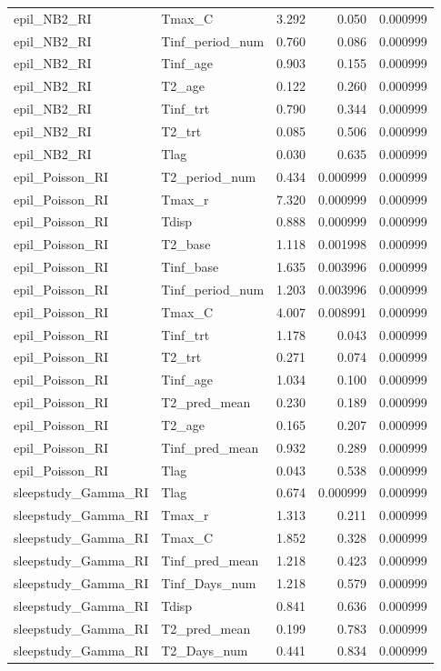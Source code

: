 \begin{landscape}
\begin{center}
\begin{longtable}{llrrr}
epil\_NB2\_RI & Tmax\_C & 3.292 & 0.050 & 0.000999 \\
epil\_NB2\_RI & Tinf\_period\_num & 0.760 & 0.086 & 0.000999 \\
epil\_NB2\_RI & Tinf\_age & 0.903 & 0.155 & 0.000999 \\
epil\_NB2\_RI & T2\_age & 0.122 & 0.260 & 0.000999 \\
epil\_NB2\_RI & Tinf\_trt & 0.790 & 0.344 & 0.000999 \\
epil\_NB2\_RI & T2\_trt & 0.085 & 0.506 & 0.000999 \\
epil\_NB2\_RI & Tlag & 0.030 & 0.635 & 0.000999 \\
epil\_Poisson\_RI & T2\_period\_num & 0.434 & 0.000999 & 0.000999 \\
epil\_Poisson\_RI & Tmax\_r & 7.320 & 0.000999 & 0.000999 \\
epil\_Poisson\_RI & Tdisp & 0.888 & 0.000999 & 0.000999 \\
epil\_Poisson\_RI & T2\_base & 1.118 & 0.001998 & 0.000999 \\
epil\_Poisson\_RI & Tinf\_base & 1.635 & 0.003996 & 0.000999 \\
epil\_Poisson\_RI & Tinf\_period\_num & 1.203 & 0.003996 & 0.000999 \\
epil\_Poisson\_RI & Tmax\_C & 4.007 & 0.008991 & 0.000999 \\
epil\_Poisson\_RI & Tinf\_trt & 1.178 & 0.043 & 0.000999 \\
epil\_Poisson\_RI & T2\_trt & 0.271 & 0.074 & 0.000999 \\
epil\_Poisson\_RI & Tinf\_age & 1.034 & 0.100 & 0.000999 \\
epil\_Poisson\_RI & T2\_pred\_mean & 0.230 & 0.189 & 0.000999 \\
epil\_Poisson\_RI & T2\_age & 0.165 & 0.207 & 0.000999 \\
epil\_Poisson\_RI & Tinf\_pred\_mean & 0.932 & 0.289 & 0.000999 \\
epil\_Poisson\_RI & Tlag & 0.043 & 0.538 & 0.000999 \\
sleepstudy\_Gamma\_RI & Tlag & 0.674 & 0.000999 & 0.000999 \\
sleepstudy\_Gamma\_RI & Tmax\_r & 1.313 & 0.211 & 0.000999 \\
sleepstudy\_Gamma\_RI & Tmax\_C & 1.852 & 0.328 & 0.000999 \\
sleepstudy\_Gamma\_RI & Tinf\_pred\_mean & 1.218 & 0.423 & 0.000999 \\
sleepstudy\_Gamma\_RI & Tinf\_Days\_num & 1.218 & 0.579 & 0.000999 \\
sleepstudy\_Gamma\_RI & Tdisp & 0.841 & 0.636 & 0.000999 \\
sleepstudy\_Gamma\_RI & T2\_pred\_mean & 0.199 & 0.783 & 0.000999 \\
sleepstudy\_Gamma\_RI & T2\_Days\_num & 0.441 & 0.834 & 0.000999 \\
\end{longtable}
\end{center}
\end{landscape}
